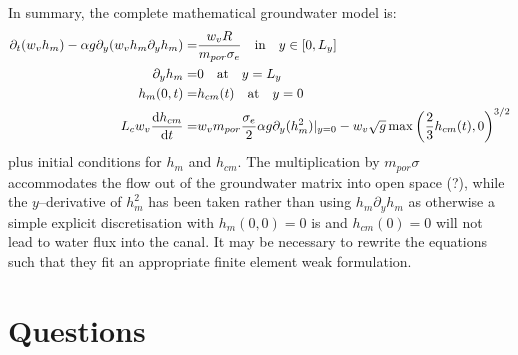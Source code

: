 \documentclass [12pt,english]{article}
\def\frac#1#2{ {#1\over#2}}
\begin{document}
In summary, the complete mathematical groundwater model is:
\begin{align}
  \partial_t(w_v h_m)-\alpha g\partial_y(w_v h_m\partial_y h_m) =& \frac {w_v R}{m_{por} \sigma_e}\quad\textrm{in}\quad
y\in[0,L_y]\label{eqngroundwsys}\\
  \partial_y h_m =& 0\quad\textrm{at}\quad y=L_y\\
  h_m(0,t) =& h_{cm}(t)\quad\textrm{at}\quad y=0\\
  L_c w_v \frac {{\rm d}h_{cm}}{{\rm d} t} =&
w_v m_{por}\frac {\sigma_e}{2}\alpha g \partial_y(h_m^2)|_{y=0}
-w_v \sqrt{g} \max{\left(\frac 23 h_{cm}(t),0\right)}^{3/2}\label{eqngroundwsysc}
\end{align}
plus initial conditions for $h_m$ and $h_{cm}$.
The multiplication by $m_{por}\sigma$ accommodates the flow out of the groundwater matrix into open space (?),
while the $y$--derivative of $h_m^2$ has been taken rather than using  $h_m \partial_y h_m$ as
otherwise a simple explicit discretisation with
$h_m(0,0)=0$ is and $h_{cm}(0)=0$ will not lead to water flux into the canal. 
It may be necessary to rewrite the equations such that they fit an appropriate finite element weak formulation.

\section{Questions}
\end{document}
